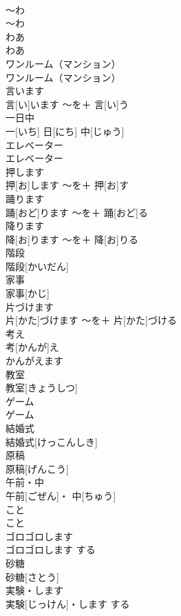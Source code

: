 \documentclass[8pt]{extreport}
\begin{document}
\begin{CJK}{UTF8}{min}
\\	〜わ	
\\	〜わ		
\\	わあ	
\\	わあ		
\\	ワンルーム（マンション）	
\\	ワンルーム（マンション）		
\\	言います	
\\	言[い]います	〜を＋ 言[い]う	
\\	一日中	
\\	一[いち] 日[にち] 中[じゅう]		
\\	エレベーター	
\\	エレベーター		
\\	押します	
\\	押[お]します	〜を＋ 押[お]す	
\\	踊ります	
\\	踊[おど]ります	〜を＋ 踊[おど]る	
\\	降ります	
\\	降[お]ります	〜を＋ 降[お]りる	
\\	階段	
\\	階段[かいだん]		
\\	家事	
\\	家事[かじ]		
\\	片づけます	
\\	片[かた]づけます	〜を＋ 片[かた]づける	
\\	考え	
\\	考[かんが]え	
\\	かんがえます 
\\	教室	
\\	教室[きょうしつ]		
\\	ゲーム	
\\	ゲーム		
\\	結婚式	
\\	結婚式[けっこんしき]		
\\	原稿	
\\	原稿[げんこう]		
\\	午前・中	
\\	午前[ごぜん]・ 中[ちゅう]		
\\	こと	
\\	こと		
\\	ゴロゴロします	
\\	ゴロゴロします	する	
\\	砂糖	
\\	砂糖[さとう]		
\\	実験・します	
\\	実験[じっけん]・します	する	

\end{CJK}
\end{document}
